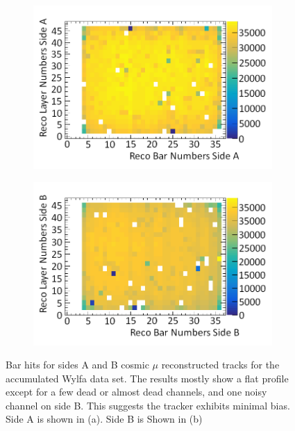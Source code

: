\begin{figure}[!h]
\centering
\begin{subfigure}{.5\textwidth}
  \centering
  \includegraphics[width=\linewidth]{Chapter6/Figs/Raster/wylfaSideAHitsMedText.png}
  \captionsetup{width=.9\linewidth}
  \caption{}
  \label{subFig:wylfaSideAHits}
\end{subfigure}%
\begin{subfigure}{.5\textwidth}
  \centering
\includegraphics[width=\linewidth]{Chapter6/Figs/Raster/wylfaSideBHitsMedText.png}
  \captionsetup{width=.9\linewidth}
  \caption{}
  \label{subFig:wylfaSideBHits}
\end{subfigure}
\caption{Bar hits for sides A and B cosmic $\mu$ reconstructed tracks for the accumulated Wylfa data set. The results mostly show a flat profile except for a few dead or almost dead channels, and one noisy channel on side B. This suggests the tracker exhibits minimal bias. Side A is shown in (a). Side B is Shown in (b)}
\label{fig:wylfaSideABHits}
\end{figure}

